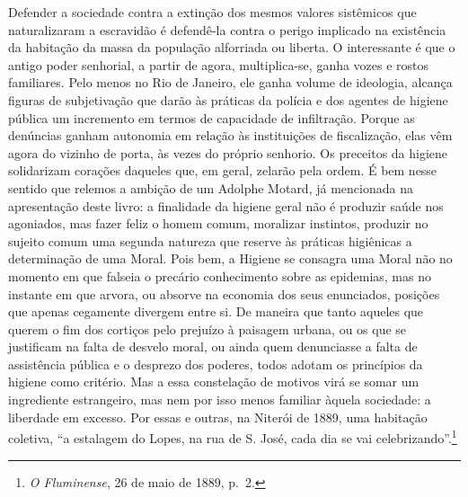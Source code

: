 Defender a sociedade contra a extinção dos mesmos valores sistêmicos que
naturalizaram a escravidão é defendê-la contra o perigo implicado na
existência da habitação da massa da população alforriada ou liberta. O
interessante é que o antigo poder senhorial, a partir de agora,
multiplica-se, ganha vozes e rostos familiares. Pelo menos no Rio de
Janeiro, ele ganha volume de ideologia, alcança figuras de subjetivação
que darão às práticas da polícia e dos agentes de higiene pública um
incremento em termos de capacidade de infiltração. Porque as denúncias
ganham autonomia em relação às instituições de fiscalização, elas vêm
agora do vizinho de porta, às vezes do próprio senhorio. Os preceitos da
higiene solidarizam corações daqueles que, em geral, zelarão pela ordem.
É bem nesse sentido que relemos a ambição de um Adolphe Motard, já
mencionada na apresentação deste livro: a finalidade da higiene geral
não é produzir saúde nos agoniados, mas fazer feliz o homem comum,
moralizar instintos, produzir no sujeito comum uma segunda natureza que
reserve às práticas higiênicas a determinação de uma Moral. Pois bem, a
Higiene se consagra uma Moral não no momento em que falseia o precário
conhecimento sobre as epidemias, mas no instante em que arvora, ou
absorve na economia dos seus enunciados, posições que apenas cegamente
divergem entre si. De maneira que tanto aqueles que querem o fim dos
cortiços pelo prejuízo à paisagem urbana, ou os que se justificam na
falta de desvelo moral, ou ainda quem denunciasse a falta de assistência
pública e o desprezo dos poderes, todos adotam os princípios da higiene
como critério. Mas a essa constelação de motivos virá se somar um
ingrediente estrangeiro, mas nem por isso menos familiar àquela
sociedade: a liberdade em excesso. Por essas e outras, na Niterói de
1889, uma habitação coletiva, ``a estalagem do Lopes, na rua de S. José,
cada dia se vai celebrizando''.\footnote{\textit{O Fluminense}, 26 de maio
  de 1889, p.~2.}

